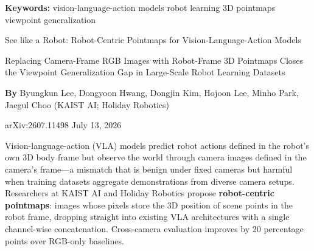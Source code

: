 \documentclass[10pt,twocolumn]{article}
\begin{document}
\setlength{\parindent}{0pt}
\setlength{\parskip}{4pt}

{\small\color{keywordgray}\textbf{Keywords:}
  vision-language-action models \textbullet{}
  robot learning \textbullet{}
  3D pointmaps \textbullet{}
  viewpoint generalization}\par\vspace{4pt}

{\LARGE\bfseries\raggedright
  See like a Robot: Robot-Centric Pointmaps
  for Vision-Language-Action Models}\par\vspace{4pt}

{\large\itshape\raggedright
  Replacing Camera-Frame RGB Images with Robot-Frame 3D Pointmaps
  Closes the Viewpoint Generalization Gap in Large-Scale
  Robot Learning Datasets}\par\vspace{6pt}

{\small\textbf{By} Byungkun Lee, Dongyoon Hwang, Dongjin Kim,
  Hojoon Lee, Minho Park, Jaegul Choo
  (KAIST AI; Holiday Robotics)}\par\vspace{2pt}

{\small\color{keywordgray}arXiv:2607.11498 \textbullet{} July 13, 2026}
\par\vspace{2pt}\noindent{\color{rulered}\rule{\columnwidth}{0.6pt}}\vspace{6pt}

Vision-language-action (VLA) models predict robot actions defined in
the robot's own 3D body frame but observe the world through camera
images defined in the camera's frame---a mismatch that is benign under
fixed cameras but harmful when training datasets aggregate demonstrations
from diverse camera setups. Researchers at KAIST AI and Holiday Robotics
propose \textbf{robot-centric pointmaps}: images whose pixels store the
3D position of scene points in the robot frame, dropping straight into
existing VLA architectures with a single channel-wise concatenation.
Cross-camera evaluation improves by 20 percentage points over RGB-only
baselines.
\end{document}

